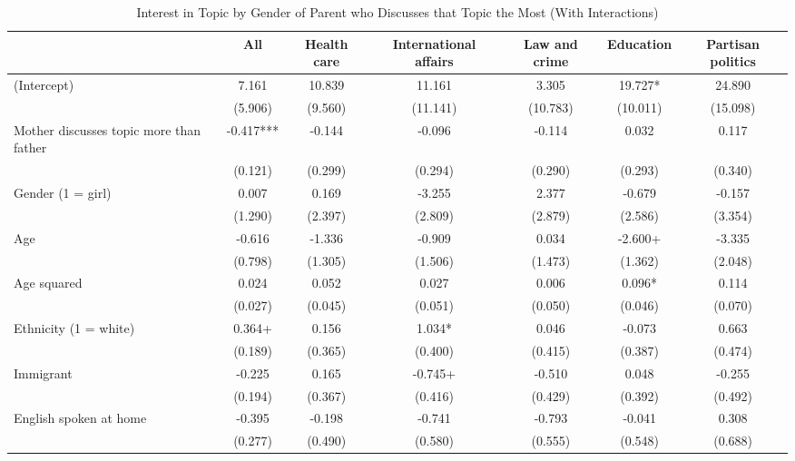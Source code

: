 \documentclass[
  letterpaper,
  DIV=11,
  numbers=noendperiod]{scrreprt}
\begin{document}
\begin{table}
\centering\centering
\caption{Interest in Topic by Gender of Parent who Discusses that Topic the Most (With Interactions) \label{tab:lmeParentCtrlInterac}}
\centering
\fontsize{6}{8}\selectfont
\begin{tabular}[t]{lcccccc}
\toprule
 & All & Health care & International affairs & Law and crime & Education & Partisan politics\\
\midrule
(Intercept) & 7.161 & 10.839 & 11.161 & 3.305 & 19.727* & 24.890\\
\hspace{1em} & (5.906) & (9.560) & (11.141) & (10.783) & (10.011) & (15.098)\\
Mother discusses topic more than father & -0.417*** & -0.144 & -0.096 & -0.114 & 0.032 & 0.117\\
\hspace{1em} & (0.121) & (0.299) & (0.294) & (0.290) & (0.293) & (0.340)\\
Gender (1 = girl) & 0.007 & 0.169 & -3.255 & 2.377 & -0.679 & -0.157\\
\hspace{1em} & (1.290) & (2.397) & (2.809) & (2.879) & (2.586) & (3.354)\\
Age & -0.616 & -1.336 & -0.909 & 0.034 & -2.600+ & -3.335\\
\hspace{1em} & (0.798) & (1.305) & (1.506) & (1.473) & (1.362) & (2.048)\\
Age squared & 0.024 & 0.052 & 0.027 & 0.006 & 0.096* & 0.114\\
\hspace{1em} & (0.027) & (0.045) & (0.051) & (0.050) & (0.046) & (0.070)\\
Ethnicity (1 = white) & 0.364+ & 0.156 & 1.034* & 0.046 & -0.073 & 0.663\\
\hspace{1em} & (0.189) & (0.365) & (0.400) & (0.415) & (0.387) & (0.474)\\
Immigrant & -0.225 & 0.165 & -0.745+ & -0.510 & 0.048 & -0.255\\
\hspace{1em} & (0.194) & (0.367) & (0.416) & (0.429) & (0.392) & (0.492)\\
English spoken at home & -0.395 & -0.198 & -0.741 & -0.793 & -0.041 & 0.308\\
\hspace{1em} & (0.277) & (0.490) & (0.580) & (0.555) & (0.548) & (0.688)\\

\end{tabular}
\end{table}
\end{document}
